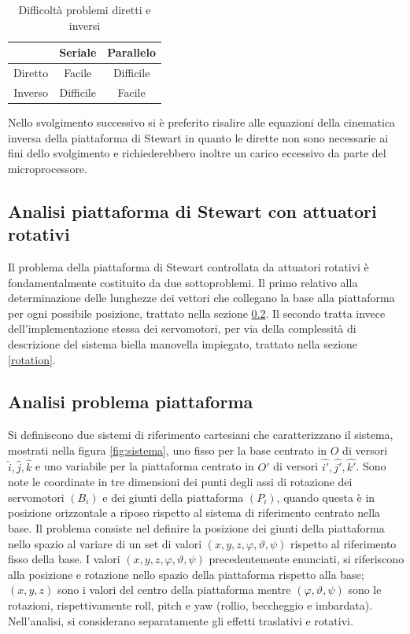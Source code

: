 \documentclass[11pt]{article}
\begin{document}
\begin{table}[h!]
\centering
\begin{tabular}{c|cc}
        & Seriale   & Parallelo  \\ 
\hline
Diretto & Facile    & Difficile  \\
Inverso & Difficile & Facile    
\end{tabular}
\caption{Difficoltà problemi diretti e inversi} \label{fig:tabella}
\end{table}



Nello svolgimento successivo si è preferito risalire alle equazioni della cinematica inversa della piattaforma di Stewart in quanto le dirette non sono necessarie ai fini dello svolgimento e richiederebbero inoltre un carico eccessivo da parte del microprocessore.



\subsection{Analisi piattaforma di Stewart con attuatori rotativi}\label{analisi}

Il problema della piattaforma di Stewart controllata da attuatori rotativi è fondamentalmente costituito da due sottoproblemi.
Il primo relativo alla determinazione delle lunghezze dei vettori che collegano la base alla piattaforma per ogni possibile posizione, trattato nella sezione \ref{platform}. Il secondo tratta invece dell'implementazione stessa dei servomotori, per via della complessità di descrizione del sistema biella manovella impiegato, trattato nella sezione \ref{rotation}. 

\subsection{Analisi problema piattaforma}\label{platform}

Si definiscono due sistemi di riferimento cartesiani che caratterizzano il sistema, mostrati nella figura \ref{fig:sistema}, uno fisso per la base centrato in $O$ di versori $\hat{i},\hat{j},\hat{k}$ e uno variabile per la piattaforma centrato in $O'$ di versori $\hat{i'},\hat{j'},\hat{k'}$. Sono note le coordinate in tre dimensioni dei punti degli assi di rotazione dei servomotori $({B_i})$ e dei giunti della piattaforma $(P_i)$, quando questa è in posizione orizzontale a riposo rispetto al sistema di riferimento centrato nella base. Il problema consiste nel definire la posizione dei giunti della piattaforma nello spazio al variare di un set di valori $(x,y,z,\varphi,\vartheta,\psi)$ rispetto al riferimento fisso della base. I valori $(x,y,z,\varphi,\vartheta,\psi)$ precedentemente enunciati, si riferiscono alla posizione e rotazione nello spazio della piattaforma rispetto alla base; $(x,y,z)$ sono i valori del centro della piattaforma mentre $(\varphi,\vartheta,\psi)$ sono le rotazioni, rispettivamente roll, pitch e yaw (rollio, beccheggio e imbardata). Nell'analisi, si considerano separatamente gli effetti traslativi e rotativi.
\end{document}
